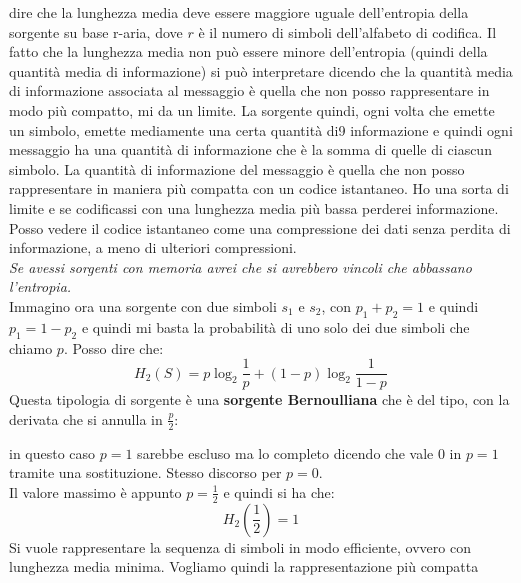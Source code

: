 \documentclass[a4paper,12pt, oneside]{book}
\begin{document}
dire che la lunghezza media deve essere maggiore uguale dell'entropia della
sorgente su base r-aria, dove $r$ è il numero di simboli dell'alfabeto di
codifica. Il fatto che la lunghezza media non può essere minore dell'entropia
(quindi della quantità media di informazione)
si può interpretare dicendo che la quantità media di informazione associata al
messaggio è quella che non posso rappresentare in modo più compatto, mi da un
limite. La sorgente quindi, ogni volta che emette un simbolo, emette mediamente
una certa quantità di9 informazione e quindi ogni messaggio ha una quantità di
informazione che è la somma di quelle di ciascun simbolo. La quantità di
informazione del messaggio è quella che non posso rappresentare in maniera più
compatta con un codice istantaneo. Ho una sorta di limite e se codificassi con
una lunghezza media più bassa perderei informazione. Posso vedere il codice
istantaneo come una compressione dei dati senza perdita di informazione, a meno
di ulteriori compressioni.\\
\textit{Se avessi sorgenti con memoria avrei che si avrebbero vincoli che
  abbassano l'entropia.} \\
Immagino ora una sorgente con due simboli $s_1$ e $s_2$, con $p_1+p_2=1$ e
quindi $p_1=1-p_2$ e quindi mi basta la probabilità di uno solo dei due simboli
che chiamo $p$. Posso dire che:
\[H_2(S)=p\log_2\frac{1}{p}+(1-p)\log_2\frac{1}{1-p}\]
Questa tipologia di sorgente è una \textbf{sorgente Bernoulliana} che è del
tipo, con la derivata che si annulla in $\frac{p}{2}$:
\begin{figure}[H]
  \centering
  \label{fig:ber}
\end{figure}
in questo caso $p=1$ sarebbe escluso ma lo completo dicendo che vale 0 in $p=1$
tramite una sostituzione. Stesso discorso per $p=0$. \\
Il valore massimo è appunto $p=\frac{1}{2}$ e quindi si ha che:
\[H_2\left(\frac{1}{2}\right)=1\]
Si vuole rappresentare la sequenza di simboli in modo efficiente, ovvero con
lunghezza media minima. Vogliamo quindi la rappresentazione più compatta
\end{document}
